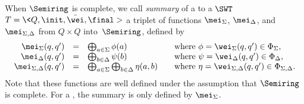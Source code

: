 \noindent 
When $\Semiring$ is complete, we call \emph{summary} of a 
to a $\SWT$ $T = \< Q, \init, \bar{\wei}, \final >$
a triplet of functions 
$\mei_\Sigma$, $\mei_\Delta$, and $\mei_{\Sigma, \Delta}$
from $Q \times Q$ into~$\Semiring$, defined by 
\[
\begin{array}{rcll}
\mei_\Sigma(q, q') & = & \bigoplus_{a \in \Sigma} \phi(a) & 
\quad\mathrm{where~} \phi = \wei_\Sigma(q, q') \in \Phi_\Sigma,\\
\mei_\Delta(q, q') & = & \bigoplus_{b \in \Delta} \psi(b) & 
\quad\mathrm{where~} \psi = \wei_\Delta(q, q') \in \Phi_\Delta,\\
\mei_{\Sigma, \Delta}(q, q') & = & 
 \bigoplus_{a \in \Sigma} \bigoplus_{b \in \Delta} \eta(a, b) & 
\quad\mathrm{where~} \eta = \wei_{\Sigma, \Delta}(q, q') \in \Phi_{\Sigma, \Delta}.\\
\end{array}      
\]
Note that these functions are well defined under the assumption that $\Semiring$ is complete.
For a \SWA, the summary is only defined by $\mei_\Sigma$.
